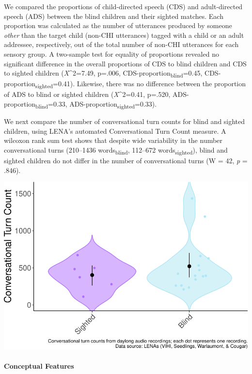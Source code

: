 \documentclass[english,man]{apa6}
\begin{document}
We compared the proportions of child-directed speech (CDS) and adult-directed speech (ADS) between the blind children and their sighted matches. Each proportion was calculated as the number of utterances produced by someone \emph{other} than the target child (non-CHI utterances) tagged with a child or an adult addressee, respectively, out of the total number of non-CHI utterances for each sensory group. A two-sample test for equality of proportions revealed no significant difference in the overall proportions of CDS to blind children and CDS to sighted children (\emph{X}\^{}2=7.49, p=.006, CDS-proportion\textsubscript{blind}=0.45, CDS-proportion\textsubscript{sighted}=0.41). Likewise, there was no difference between the proportion of ADS to blind or sighted children (\emph{X}\^{}2=0.41, p=.520, ADS-proportion\textsubscript{blind}=0.33, ADS-proportion\textsubscript{sighted}=0.33).

We next compare the number of conversational turn counts for blind and sighted children, using LENA's automated Conversational Turn Count measure. A wilcoxon rank sum test shows that despite wide variability in the number conversational turns (210--1436 words\textsubscript{blind}, 112--672 words\textsubscript{sighted}), blind and sighted children do not differ in the number of conversational turns (W = 42, \emph{p} = .846).

\includegraphics{input_quality_manuscript_files/figure-latex/CTC-1.pdf}

\hypertarget{conceptual-features}{%
\paragraph{Conceptual Features}\label{conceptual-features}}
\end{document}
